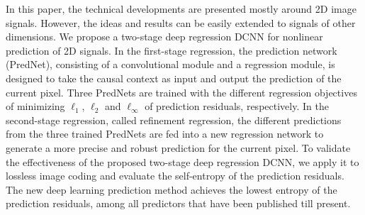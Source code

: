 \documentclass{article}
\begin{document}




In this paper, the technical developments are presented mostly around 2D image signals.
However, the ideas and results can be easily extended to signals of other dimensions.
We propose a two-stage deep regression DCNN for nonlinear prediction of 2D signals.
In the first-stage regression, the prediction network (PredNet), consisting of a convolutional module and a regression module, is designed to take the causal context as input and output the prediction of the current pixel.
Three PredNets are trained with the different regression objectives of minimizing $\ell_1$, $\ell_2$ and $\ell_\infty$ of prediction residuals, respectively.
In the second-stage regression, called refinement regression, the different predictions from the three trained PredNets are fed into a new regression network to generate a more precise and robust prediction for the current pixel.
To validate the effectiveness of the proposed two-stage deep regression DCNN, we apply it to lossless image coding and evaluate the self-entropy of the prediction residuals.  The new deep learning prediction method achieves the lowest entropy of the prediction residuals, among all predictors that have been published till present.
\end{document}
